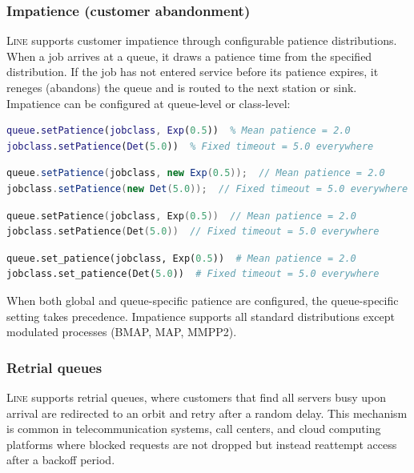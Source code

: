 \subsubsection{Impatience (customer abandonment)}
\label{sec:impatience}
\textsc{Line} supports customer impatience through configurable patience distributions. When a job arrives at a queue, it draws a patience time from the specified distribution. If the job has not entered service before its patience expires, it reneges (abandons) the queue and is routed to the next station or sink. Impatience can be configured at queue-level or class-level:

\begin{MATLAB}
\begin{lstlisting}[language = matlab]
queue.setPatience(jobclass, Exp(0.5))  % Mean patience = 2.0
jobclass.setPatience(Det(5.0))  % Fixed timeout = 5.0 everywhere
\end{lstlisting}
\end{MATLAB}
\begin{JAVA}
\begin{lstlisting}[language = java, basicstyle=\ttfamily\scriptsize]
queue.setPatience(jobclass, new Exp(0.5));  // Mean patience = 2.0
jobclass.setPatience(new Det(5.0));  // Fixed timeout = 5.0 everywhere
\end{lstlisting}
\end{JAVA}
\begin{KOTLIN}
\begin{lstlisting}[language = kotlin, basicstyle=\ttfamily\scriptsize]
queue.setPatience(jobclass, Exp(0.5))  // Mean patience = 2.0
jobclass.setPatience(Det(5.0))  // Fixed timeout = 5.0 everywhere
\end{lstlisting}
\end{KOTLIN}
\begin{PYTHON}
\begin{lstlisting}[language = python]
queue.set_patience(jobclass, Exp(0.5))  # Mean patience = 2.0
jobclass.set_patience(Det(5.0))  # Fixed timeout = 5.0 everywhere
\end{lstlisting}
\end{PYTHON}
When both global and queue-specific patience are configured, the queue-specific setting takes precedence. Impatience supports all standard distributions except modulated processes (BMAP, MAP, MMPP2).

\subsubsection{Retrial queues}
\label{sec:retrial}
\textsc{Line} supports retrial queues, where customers that find all servers busy upon arrival are redirected to an orbit and retry after a random delay. This mechanism is common in telecommunication systems, call centers, and cloud computing platforms where blocked requests are not dropped but instead reattempt access after a backoff period.


